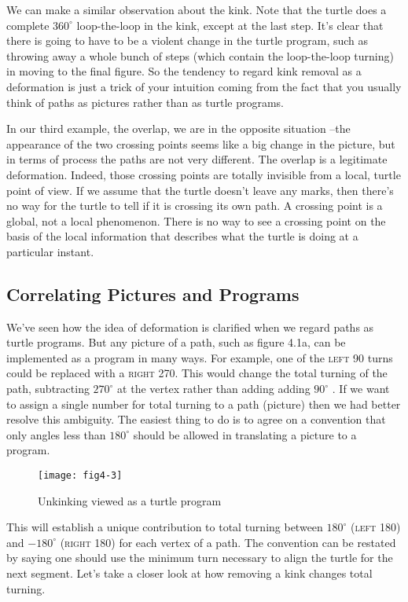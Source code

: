 \documentclass{book}
\begin{document}
We can make a similar observation about the kink. Note that the
turtle does a complete $360^{\circ}$ loop-the-loop in the kink, except at the last
step. It's clear that there is going to have to be a violent change in the
turtle program, such as throwing away a whole bunch of steps (which
contain the loop-the-loop turning) in moving to the final figure. So the
tendency to regard kink removal as a deformation is just a trick of your
intuition coming from the fact that you usually think of paths as pictures
rather than as turtle programs.

In our third example, the overlap, we are in the opposite situation --the appearance of the two crossing points seems like a big change in the
picture, but in terms of process the paths are not very different. The
overlap is a legitimate deformation. Indeed, those crossing points are
totally invisible from a local, turtle point of view. If we assume that the
turtle doesn't leave any marks, then there's no way for the turtle to tell
if it is crossing its own path. A crossing point is a global, not a local
phenomenon. There is no way to see a crossing point on the basis of the
local information that describes what the turtle is doing at a particular
instant.

\subsection{Correlating Pictures and Programs}

We've seen how the idea of deformation is clarified when we regard paths
as turtle programs. But any picture of a path, such as figure 4.1a, can
be implemented as a program in many ways. For example, one of the
\textsc{left} 90 turns could be replaced with a \textsc{right} 270. This would change
the total turning of the path, subtracting $270^{\circ}$  at the vertex rather than
adding adding $90^{\circ}$ . If we want to assign a single number for total turning
to a path (picture) then we had better resolve this ambiguity.
The easiest thing to do is to agree on a convention that only angles
less than $180^{\circ}$ should be allowed in translating a picture to a program.

\begin{figure}
\begin{center}
\texttt{[image: fig4-3]}
\caption{Unkinking viewed as a turtle program}
\end{center}
\end{figure}

This will establish a unique contribution to total turning between $180^{\circ}$
(\textsc{left} 180) and $-180^{\circ}$ (\textsc{right} 180) for each vertex of a path. The
convention can be restated by saying one should use the minimum turn
necessary to align the turtle for the next segment.
Let's take a closer look at how removing a kink changes total turning.
\end{document}
